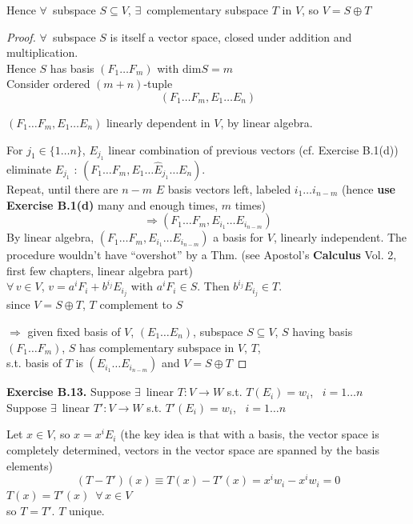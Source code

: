 \documentclass[11pt]{amsart}
\theoremstyle{definition}
\newcommand{\exercisehead}[1]{\medskip\noindent\textbf{Exercise #1.} }
\begin{document}
Hence $\forall \, $ subspace $S \subseteq V$, $\exists \, $ complementary subspace $T$ in $V$, so $V = S \oplus T$

\begin{proof}
$\forall \, $ subspace $S$ is itself a vector space, closed under addition and multiplication. \\
\phantom{ \quad } Hence $S$ has basis $(F_1 \dots F_m)$ with $\text{dim}S = m$ \\

Consider ordered $(m+n)$-tuple
\[
(F_1 \dots F_m, E_1 \dots E_n)
\]

$(F_1 \dots F_m, E_1 \dots E_n)$ linearly dependent in $V$, by linear algebra.

For $j_1 \in \lbrace 1 \dots n \rbrace$, $E_{j_1}$ linear combination of previous vectors (cf. Exercise B.1(d)) \\
\phantom{ \quad } eliminate $E_{j_1}$ : $(F_1 \dots F_m, E_1 \dots \widehat{E}_{j_1} \dots E_n )$. \\

Repeat, until there are $n-m$ $E$ basis vectors left, labeled $i_1 \dots i_{n-m}$ (hence \textbf{use Exercise B.1(d)} many and enough times, $m$ times)
\[
\Longrightarrow (F_1 \dots F_m, E_{i_1} \dots E_{i_{n-m}} )
\]
By linear algebra, $(F_1 \dots F_m, E_{i_1} \dots E_{i_{n-m}})$ a basis for $V$, linearly independent. The procedure wouldn't have ``overshot'' by a Thm. (see Apostol's \textbf{Calculus} Vol. 2, first few chapters, linear algebra part) \\

$\forall \, v\in V$, $v= a^iF_i  + b^{i_j} E_{i_j}$ with $a^i F_i \in S$.  Then $b^{i_j} E_{i_j} \in T$.  \\
\phantom{ \quad } since $V = S\oplus T$, $T$ complement to $S$

$\Longrightarrow $ given fixed basis of $V$, $(E_1 \dots E_n)$, subspace $S \subseteq V$, $S$ having basis $(F_1 \dots F_m)$, $S$ has complementary subspace in $V$, $T$, \\
\phantom{ \quad } s.t. basis of $T$ is $(E_{i_1} \dots E_{i_{n-m}})$ and $V = S\oplus T$

\end{proof}


\exercisehead{B.13}  Suppose $\exists \, $ linear $T: V \to W $ s.t. $T(E_i) = w_i$, \quad \, $i = 1 \dots n$ \\
Suppose $\exists \, $ linear $T':V \to W$ s.t. $T'(E_i)= w_i$, \quad \, $i = 1 \dots n$

Let $x\in V$, so $x  = x^i E_i$ (the key idea is that with a basis, the vector space is completely determined, vectors in the vector space are spanned by the basis elements)
\[
(T-T')(x) \equiv T(x) - T'(x)  = x^i w_i - x^i w_i = 0
\]
$T(x) = T'(x)$\quad \, $\forall \, x \in V$ \\
so $T=T'$.  $T$ unique.
\end{document}
